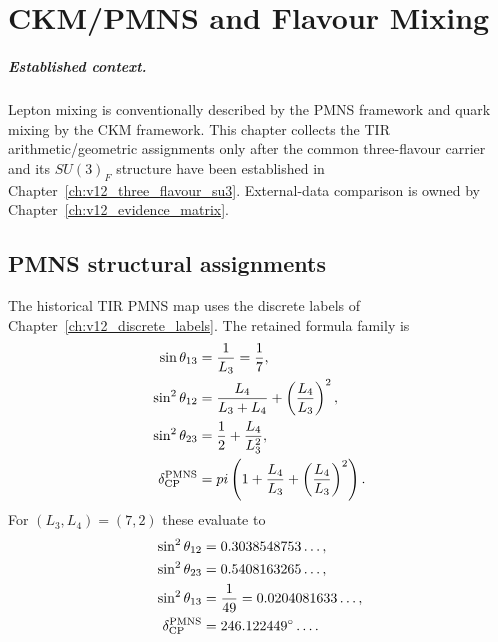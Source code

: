 \chapter{CKM/PMNS and Flavour Mixing}
\label{ch:v12_ckm_pmns}

\paragraph{Established context.}
Lepton mixing is conventionally described by the PMNS framework and quark
mixing by the CKM framework.  This chapter collects the TIR arithmetic/geometric
assignments only after the common three-flavour carrier and its $SU(3)_F$
structure have been established in Chapter~\ref{ch:v12_three_flavour_su3}.
External-data comparison is owned by Chapter~\ref{ch:v12_evidence_matrix}.

\section{PMNS structural assignments}
The historical TIR PMNS map uses the discrete labels of
Chapter~\ref{ch:v12_discrete_labels}.  The retained formula family is
\begin{align}
\sin\theta_{13}
&=\frac1{L_3}=\frac17,
\label{eq:v12-pmns-theta13}\\
\sin^2\theta_{12}
&=\frac{L_4}{L_3+L_4}
+\left(\frac{L_4}{L_3}\right)^2,
\label{eq:v12-pmns-theta12}\\
\sin^2\theta_{23}
&=\frac12+\frac{L_4}{L_3^2},
\label{eq:v12-pmns-theta23}\\
\delta_{\rm CP}^{\rm PMNS}
&=\pi\left(
1+\frac{L_4}{L_3}
+\left(\frac{L_4}{L_3}\right)^2
\right).
\label{eq:v12-pmns-delta}
\end{align}
For $(L_3,L_4)=(7,2)$ these evaluate to
\begin{align}
\sin^2\theta_{12}&=0.3038548753\ldots,\\
\sin^2\theta_{23}&=0.5408163265\ldots,\\
\sin^2\theta_{13}&=\frac1{49}=0.0204081633\ldots,\\
\delta_{\rm CP}^{\rm PMNS}&=246.122449^\circ\ldots .
\end{align}

